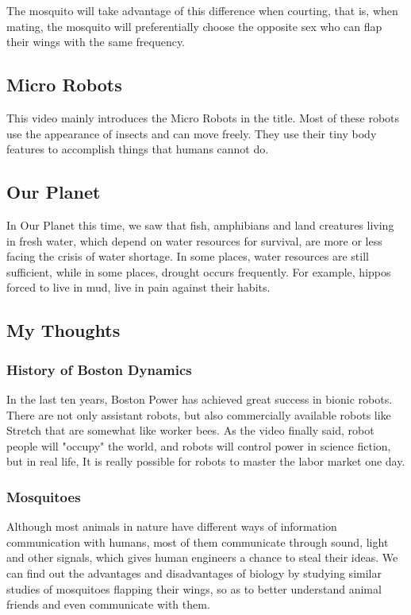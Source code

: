 \documentclass{article}
\begin{document}
The mosquito will take advantage of this difference when courting, that is, when mating, the mosquito will preferentially choose the opposite sex who can flap their wings with the same frequency.
\subsection{Micro Robots}
This video mainly introduces the Micro Robots in the title. Most of these robots use the appearance of insects and can move freely. They use their tiny body features to accomplish things that humans cannot do.

\subsection{Our Planet}
In Our Planet this time, we saw that fish, amphibians and land creatures living in fresh water, which depend on water resources for survival, are more or less facing the crisis of water shortage. In some places, water resources are still sufficient, while in some places, drought occurs frequently. For example, hippos forced to live in mud, live in pain against their habits.

\subsection{My Thoughts}
\subsubsection*{History of Boston Dynamics}
In the last ten years, Boston Power has achieved great success in bionic robots. There are not only assistant robots, but also commercially available robots like Stretch that are somewhat like worker bees. As the video finally said, robot people will "occupy" the world, and robots will control power in science fiction, but in real life, It is really possible for robots to master the labor market one day.

\subsubsection*{Mosquitoes}
Although most animals in nature have different ways of information communication with humans, most of them communicate through sound, light and other signals, which gives human engineers a chance to steal their ideas. We can find out the advantages and disadvantages of biology by studying similar studies of mosquitoes flapping their wings, so as to better understand animal friends and even communicate with them.
\end{document}
